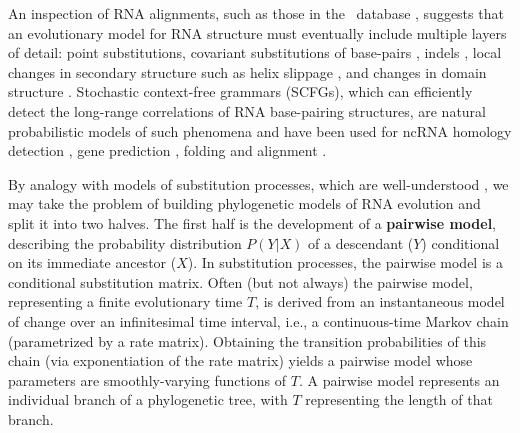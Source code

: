 \documentclass[10pt]{article}
\begin{document}
An inspection of RNA alignments, such as those in the \RFAM\ database
\cite{GriffithsJonesEtAl2003}, suggests that an evolutionary model for
RNA structure must eventually include multiple layers of detail: point
substitutions, covariant substitutions of base-pairs
\cite{HancockTautzDover88,LeontisEtAl2002}, indels
\cite{TakeshiTsutomu2008}, local changes in secondary structure such
as helix slippage \cite{HancockDover90}, and changes in domain
structure \cite{SmithEtAl2008}.  Stochastic context-free grammars
(SCFGs), which can efficiently detect the long-range correlations
of RNA base-pairing structures, are natural probabilistic models of such
phenomena and have been used for ncRNA homology detection
\cite{Eddy94,Durbin98,KleinEddy2003,NawrockiEddy2007}, gene prediction
\cite{RivasEddy99,PedersenEtAl2006}, folding
\cite{KnudsenHein2003,DowellEddy2004} and alignment
\cite{Holmes2005,DowellEddy2006,BradleyPachterHolmes2008}.

By analogy with models of substitution processes, which are well-understood \cite{Felsenstein2003},
we may take the problem of building phylogenetic models of RNA evolution and split it into two halves.
The first half is the development of a {\bf pairwise model},
describing the probability distribution $P(Y|X)$ of a descendant ($Y$) conditional on its immediate ancestor ($X$).
In substitution processes, the pairwise model is a conditional substitution matrix.
Often (but not always) the pairwise model, representing a finite evolutionary time $T$,
is derived from an instantaneous model of change over an infinitesimal time interval,
i.e., a continuous-time Markov chain (parametrized by a rate matrix).
Obtaining the transition probabilities of this chain (via exponentiation of the rate matrix)
yields a pairwise model whose parameters are smoothly-varying functions of $T$.
A pairwise model represents an individual branch of a phylogenetic tree, with $T$ representing the length of that branch.
\end{document}
